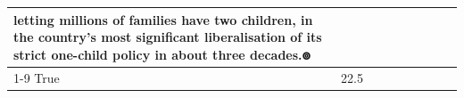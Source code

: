 \begin{table}[H]
\begin{tabular}{lllrlllll}
letting millions of families have two children, in the country's most significant liberalisation of its strict one-child policy in about three decades.ၜ \\
\cline{1-9}
True & 22.5%
\end{tabular}
\end{table}
